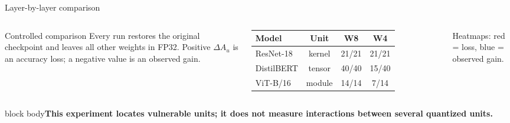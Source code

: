 \documentclass[aspectratio=169,10pt]{beamer}
\newcommand{\takeaway}[1]{\vfill\begin{beamercolorbox}[wd=\textwidth,sep=1.5mm,rounded=true]{block body}\centering\small\bfseries #1\end{beamercolorbox}}
\begin{document}
\begin{frame}{Layer-by-layer comparison}
\begin{center}
\end{center}
\vspace{3mm}
\begin{columns}[T,onlytextwidth]
\begin{block}{Controlled comparison}
\small Every run restores the original checkpoint and leaves all other weights in FP32. Positive $\Delta A_u$ is an accuracy loss; a negative value is an observed gain.
\end{block}
\centering\scriptsize
\begin{tabular}{lccc}
\toprule
Model & Unit & W8 & W4\\
\midrule
ResNet-18 & kernel & 21/21 & 21/21\\
DistilBERT & tensor & 40/40 & 15/40\\
ViT-B/16 & module & 14/14 & 7/14\\
\bottomrule
\end{tabular}
\vspace{2mm}

\scriptsize Heatmaps: red = loss, blue = observed gain.
\end{columns}
\takeaway{This experiment locates vulnerable units; it does not measure interactions between several quantized units.}
\end{frame}
\end{document}
